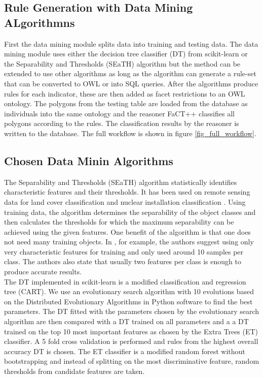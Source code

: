 \documentclass[authoryear, review,12pt,number]{elsarticle}
\begin{document}
\subsection{Rule Generation with Data Mining ALgorithmns}
First the data mining module splits data into training and testing data. 
The data mining module uses either the decision tree classifier (DT) from 
scikit-learn \citep{scikit-learn} or the Separability and Thresholds (SEaTH)
algorithm \citep{Nussbaum2006} but the method can be extended to use other
algorithms as long as the algorithm can generate a rule-set that can be
converted to OWL or into SQL queries. After the algorithms produce rules for 
each indicator, these are then added as facet restrictions to an OWL ontology. 
The polygons from the testing table are loaded from the database as individuals 
into the same ontology and the reasoner FaCT++ classifies all 
polygons according to the rules. The classification  results by the reasoner 
is written to the database. The full workflow is shown in  figure 
\ref{fig_full_workflow}.
\subsection{Chosen Data Minin Algorithms}
The Separability and Thresholds (SEaTH) algorithm \citep{Nussbaum2006}
statistically identifies characteristic features and their thresholds. It has
been used on remote sensing data for land cover classification \citep{Gao2011}
and nuclear installation classification \citep{Nussbaum2006}. Using training
data, the algorithm determines the separability of the object classes and then
calculates the thresholds for which the maximum separability can be achieved
using the given features. One benefit of the algorithm is that one does not
need many training objects. In \cite{Nussbaum2006}, for example, the authors
suggest using only very characteristic features for training and only used
around 10 samples per class. The authors also state that usually two features
per class is enough to produce accurate results.\\
The DT implemented in scikit-learn is a modified classification and regression 
tree (CART)\citep{scikit-learn}. We use an evolutionary search 
algorithm with 10 evolutions based on the Distributed Evolutionary Algorithms 
in Python \citep{DEAP_JMLR2012} software to find the best parameters. The 
DT fitted with the parameters chosen by the evolutionary search algorithm 
are then compared with a DT trained on all parameters and 
a a DT trained on the top 10 most important features as chosen by the Extra 
Trees (ET) classifier. A 5 fold cross validation is performed and rules from 
the highest overall accuracy DT is chosen. The ET classifier is a modified 
random forest without bootstrapping and instead of splitting on the most 
discriminative feature, random thresholds from candidate features are taken.
\end{document}

